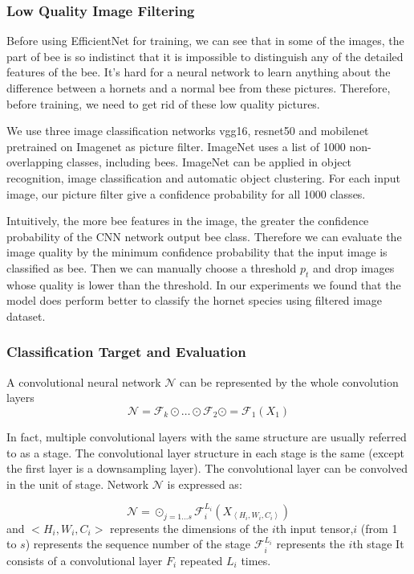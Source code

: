 \documentclass[12pt]{article}
\begin{document}
\subsubsection{Low Quality Image Filtering}
Before using EfficientNet for training, we can see that in some of the images, the part of bee is so indistinct that it is impossible to distinguish any of the detailed features of the bee. It's hard for a neural network to learn anything about the difference between a hornets and a normal bee from these pictures. Therefore, before training, we need to get rid of these low quality pictures.

We use three image classification networks vgg16, resnet50 and mobilenet pretrained on Imagenet\cite{Imagenet} as picture filter. ImageNet uses a list of 1000 non-overlapping classes, including bees. ImageNet can be applied in object recognition, image classification and automatic object clustering. For each input image, our picture filter give a confidence probability for all 1000 classes. 

Intuitively, the more bee features in the image, the greater the confidence probability of the CNN network output bee class. 
Therefore we can evaluate the image quality by the minimum confidence probability that the input image is classified as bee. Then we can manually choose a threshold $p_t$ and drop images whose quality is lower than the threshold. In our experiments we found that the model does perform better to classify the hornet species using filtered image dataset.

\subsubsection{Classification Target and Evaluation}
A convolutional neural network $\mathcal{N}$ can be represented by the whole convolution  layers
\begin{equation}
\mathcal{N}=\mathcal{F}_{k} \odot \ldots \odot \mathcal{F}_{2} \odot =  \mathcal{F}_{1}\left(X_{1}\right)
\end{equation}

In fact, multiple convolutional layers with the same structure are usually referred to as a stage. The convolutional layer structure in each stage is the same (except the first layer is a downsampling layer). The convolutional layer can be convolved in the unit of stage. Network $\mathcal{N}$ is expressed as:

\begin{equation}
\mathcal{N}= \odot_{j=1 \ldots s} \mathcal{F}_{i}^{L_{i}}\left(X_{\left\langle H_{i}, W_{i}, C_{i}\right\rangle}\right)
\end{equation}
and $< H_i,W_i,C_i>$ represents the dimensions of the  $i$th input tensor,$i$ (from 1 to $s$) represents the sequence number of the stage $\mathcal{F}_{i}^{L_{i}}$ represents the $i$th stage It consists of a convolutional layer $ F_{i}$ repeated $L_{i}$ times.
\end{document}
